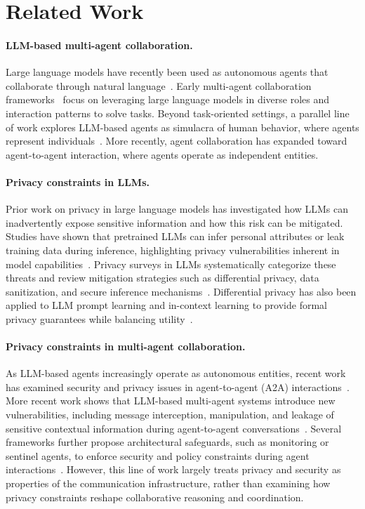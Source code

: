\section{Related Work}
\label{sec:related_work}

\paragraph{LLM-based multi-agent collaboration.}
Large language models have recently been used as autonomous agents that collaborate through natural language~\citep{han2024llmmultiagent}. 
Early multi-agent collaboration frameworks~\citep{li2023camel, metagpt, chatdev} focus on leveraging large language models in diverse roles and interaction patterns to solve tasks.
Beyond task-oriented settings, a parallel line of work explores LLM-based agents as simulacra of human behavior, where agents represent individuals~\citep{park2023generative,Wang2024AgentVerse,hua2023warandpeace, yang2024oasis}. 
More recently, agent collaboration has expanded toward agent-to-agent interaction, where agents operate as independent entities.

\paragraph{Privacy constraints in LLMs.}
Prior work on privacy in large language models has investigated how LLMs can inadvertently expose sensitive information and how this risk can be mitigated. 
Studies have shown that pretrained LLMs can infer personal attributes or leak training data during inference, highlighting privacy vulnerabilities inherent in model capabilities~\citep{staab2023beyond}. 
Privacy surveys in LLMs systematically categorize these threats and review mitigation strategies such as differential privacy, data sanitization, and secure inference mechanisms~\citep{YAO2024100211, miranda2024preservingPrivacySurvey}. 
Differential privacy has also been applied to LLM prompt learning and in-context learning to provide formal privacy guarantees while balancing utility~\citep{duan2023flocks, tang2024privacy}. 

\paragraph{Privacy constraints in multi-agent collaboration.}
As LLM-based agents increasingly operate as autonomous entities, recent work has examined security and privacy issues in agent-to-agent (A2A) interactions~\citep{a2a_protocol_what_is_a2a}. 
More recent work shows that LLM-based multi-agent systems introduce new vulnerabilities, including message interception, manipulation, and leakage of sensitive contextual information during agent-to-agent conversations~\citep{gomaa2025converse, he2025red}. 
Several frameworks further propose architectural safeguards, such as monitoring or sentinel agents, to enforce security and policy constraints during agent interactions~\citep{gosmar2025sentinel, nakamura2025terrarium}. 
However, this line of work largely treats privacy and security as properties of the communication infrastructure, rather than examining how privacy constraints reshape collaborative reasoning and coordination. 
